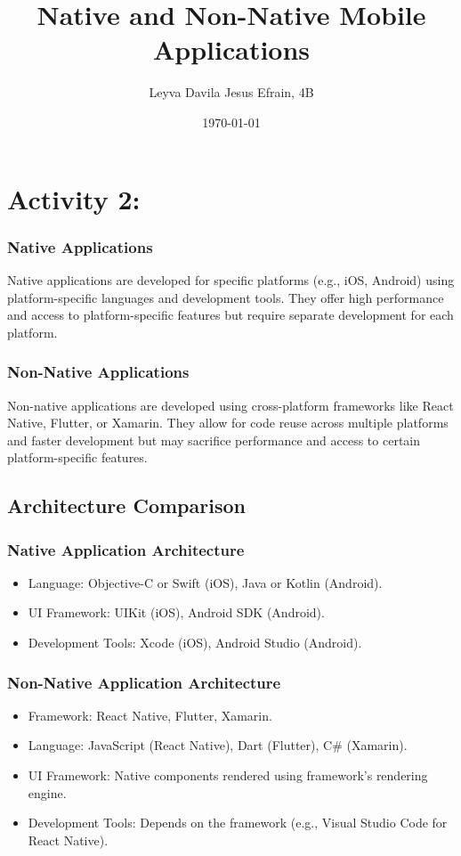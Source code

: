 \documentclass{article}
\title{Native and Non-Native Mobile Applications}
\author{Leyva Davila Jesus Efrain, 4B}
\date{\today}
\begin{document}
\maketitle

\section{Activity 2:}
\subsubsection{Native Applications}
Native applications are developed for specific platforms (e.g., iOS, Android) using platform-specific languages and development tools. They offer high performance and access to platform-specific features but require separate development for each platform.

\subsubsection{Non-Native Applications}
Non-native applications are developed using cross-platform frameworks like React Native, Flutter, or Xamarin. They allow for code reuse across multiple platforms and faster development but may sacrifice performance and access to certain platform-specific features.

\subsection{Architecture Comparison}

\subsubsection{Native Application Architecture}
\begin{itemize}
    \item Language: Objective-C or Swift (iOS), Java or Kotlin (Android).
    \item UI Framework: UIKit (iOS), Android SDK (Android).
    \item Development Tools: Xcode (iOS), Android Studio (Android).
\end{itemize}

\subsubsection{Non-Native Application Architecture}
\begin{itemize}
    \item Framework: React Native, Flutter, Xamarin.
    \item Language: JavaScript (React Native), Dart (Flutter), C\# (Xamarin).
    \item UI Framework: Native components rendered using framework's rendering engine.
    \item Development Tools: Depends on the framework (e.g., Visual Studio Code for React Native).
\end{itemize}
\end{document}
